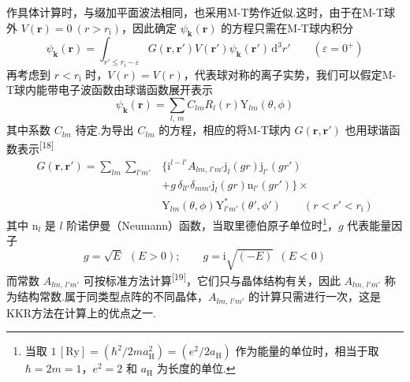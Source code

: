 作具体计算时，与缀加平面波法相同，也采用M-T势作近似.这时，由于在M-T球外 $V(\boldsymbol{r})=0\ (r>r_{\mathrm{i}})$，因此确定 $\psi_{\boldsymbol{k}}(\boldsymbol{r})$ 的方程只需在M-T球内积分
\begin{equation}
  \psi_{\boldsymbol{k}}(\boldsymbol{r})=\int_{r'\leqslant r_{\mathrm{i}}-\varepsilon}
  G(\boldsymbol{r},\boldsymbol{r}')V(\boldsymbol{r}')\psi_{\boldsymbol{k}}(\boldsymbol{r}')\,\mathrm{d}^{3}r'
  \qquad(\varepsilon=0^{+})
\end{equation}
再考虑到 $r<r_{\mathrm{i}}$ 时，$V(r)=V(r)$，代表球对称的离子实势，我们可以假定M-T球内能带电子波函数由球谐函数展开表示
\begin{equation}
  \psi_{\boldsymbol{k}}(\boldsymbol{r})=\sum_{l,\,m}C_{lm}R_{l}(r)\mathrm{Y}_{lm}(\theta,\phi)
\end{equation}
其中系数 $C_{lm}$ 待定.为导出 $C_{lm}$ 的方程，相应的将M-T球内 $G(\boldsymbol{r},\boldsymbol{r}')$ 也用球谐函数表示\textsuperscript{[18]}
\begin{equation}
\begin{aligned}
  G(\boldsymbol{r},\boldsymbol{r}')
  =\sum_{lm}\sum_{l'm'}&\bigl\{\mathrm{i}^{l-l'}A_{lm,\,l'm'}\mathrm{j}_{l}(gr)\mathrm{j}_{l'}(gr')\\
  &+g\,\delta_{ll'}\delta_{mm'}\mathrm{j}_{l}(gr)\mathrm{n}_{l'}(gr')\bigr\}\times\\
  &\mathrm{Y}_{lm}(\theta,\phi)\mathrm{Y}_{l'm'}^{*}(\theta',\phi')\qquad(r<r'<r_{\mathrm{i}})
\end{aligned}
\end{equation}
其中 $\mathrm{n}_{l}$ 是 $l$ 阶诺伊曼（Neumann）函数，当取里德伯原子单位时\footnote{当取 $1\,[\mathrm{Ry}]=(\hbar^{2}/2ma_{\mathrm{H}}^{2})=(e^{2}/2a_{\mathrm{H}})$ 作为能量的单位时，相当于取 $\hbar=2m=1$，$e^{2}=2$ 和 $a_{\mathrm{H}}$ 为长度的单位.}，$g$ 代表能量因子
\begin{equation}
  g=\sqrt{E}\ \ (E>0);\qquad g=\mathrm{i}\sqrt{(-E)}\ \ (E<0)
\end{equation}
而常数 $A_{lm,\,l'm'}$ 可按标准方法计算\textsuperscript{[19]}，它们只与晶体结构有关，因此 $A_{lm,\,l'm'}$ 称为结构常数.属于同类型点阵的不同晶体，$A_{lm,\,l'm'}$ 的计算只需进行一次，这是KKR方法在计算上的优点之一.

